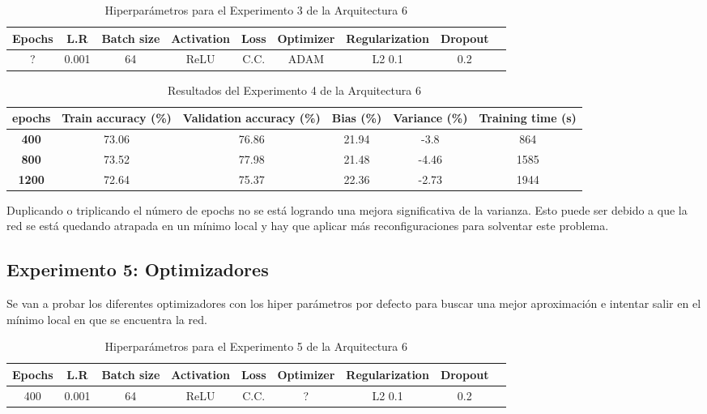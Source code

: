 \documentclass{article}
\begin{document}
        \begin{table}[!h]
				\begin{tabular}{|c|c|c|c|c|c|c|c|c|}
					\textbf{Epochs}&\textbf{L.R}&\textbf{Batch size}&\textbf{Activation}&\textbf{Loss}&\textbf{Optimizer}&\textbf{Regularization}&\textbf{Dropout}   \\ \hline
					? & 0.001 & 64 & ReLU & C.C. & ADAM & L2 0.1 & 0.2 
				\end{tabular}
				\caption{Hiperpar\'ametros para el Experimento 3 de la Arquitectura 6}
				\label{tab:hip-a6-e2}
			\end{table}

    
   
   \begin{table}[!h]
				\begin{center}
					\begin{tabular}{ c | c | c | c | c | c |}
						 \textbf{epochs} & \textbf{Train accuracy (\%)} & \textbf{Validation accuracy (\%)} & \textbf{Bias (\%)} & \textbf{Variance (\%)} & \textbf{Training time (s)} \\ \hline
						\textbf{400 } & 73.06   & 76.86 &  21.94 & -3.8 &864   \\ \hline
                        \textbf{800 } & 73.52   &77.98 &  21.48 & -4.46  &1585    \\ \hline
                        \textbf{1200} &  72.64  &75.37  &  22.36& -2.73 &1944    \\ \hline
					\end{tabular}
					\caption{Resultados del Experimento 4 de la Arquitectura 6}
					\label{tab:res-a2-e5}
				\end{center}
			\end{table}

Duplicando o triplicando el n\'umero de epochs no se est\'a logrando una mejora significativa de la varianza. Esto puede ser debido a que la red se est\'a quedando atrapada en un m\'inimo local y hay que aplicar más reconfiguraciones para solventar este problema. 
\subsection{Experimento 5: Optimizadores}
Se van a probar los diferentes optimizadores con los hiper par\'ametros por defecto para buscar una mejor aproximaci\'on e intentar salir en el m\'inimo local en que se encuentra la red. 

 \begin{table}[!h]
				\begin{tabular}{|c|c|c|c|c|c|c|c|c|}
					\textbf{Epochs}&\textbf{L.R}&\textbf{Batch size}&\textbf{Activation}&\textbf{Loss}&\textbf{Optimizer}&\textbf{Regularization}&\textbf{Dropout}   \\ \hline
					400 & 0.001 & 64 & ReLU & C.C. & ? & L2 0.1 & 0.2 
				\end{tabular}
				\caption{Hiperpar\'ametros para el Experimento 5 de la Arquitectura 6}
				\label{tab:hip-a6-e2}
			\end{table}
\end{document}
